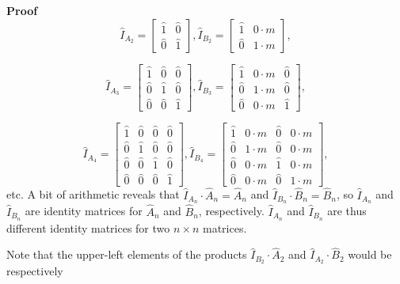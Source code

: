 \documentclass[10pt,letterpaper]{article}
\newenvironment{proof}{\noindent\textbf{Proof} }{\qed \newline}
\newcommand{\qed}{\nobreak \ifvmode \relax \else
      \ifdim\lastskip<1.5em \hskip-\lastskip
      \hskip1.5em plus0em minus0.5em \fi \nobreak
      \vrule height0.75em width0.5em depth0.25em\fi}
\numberwithin{equation}{section}
\begin{document}
\begin{proof}
\[ \hat I_{A_2} = \left[ \begin{matrix} 
  \hat 1 & \hat 0 \\
  \hat 0 & \hat 1
 \end{matrix} \right] ,
\hat I_{B_2} = \left[ \begin{matrix} 
  \hat 1 & 0 \cdot m \\
  \hat 0 & 1 \cdot m
 \end{matrix} \right] , \]
 
 \[ \hat I_{A_3} = \left[ \begin{matrix} 
  \hat 1 & \hat 0 & \hat 0 \\
  \hat 0 & \hat 1 & \hat 0 \\
  \hat 0 & \hat 0 & \hat 1
 \end{matrix} \right] ,
 \hat I_{B_3} = \left[ \begin{matrix} 
  \hat 1 & 0 \cdot m & \hat 0 \\
  \hat 0 & 1 \cdot m & \hat 0 \\
  \hat 0 & 0 \cdot m & \hat 1
 \end{matrix} \right] , \]
 
 \[ \hat I_{A_4} = \left[ \begin{matrix} 
  \hat 1 & \hat 0 & \hat 0 & \hat 0 \\
  \hat 0 & \hat 1 & \hat 0 & \hat 0 \\
  \hat 0 & \hat 0 & \hat 1 & \hat 0 \\
  \hat 0 & \hat 0 & \hat 0 & \hat 1
 \end{matrix} \right] ,
 \hat I_{B_4} = \left[ \begin{matrix} 
  \hat 1 & 0 \cdot m & \hat 0 & 0 \cdot m \\
  \hat 0 & 1 \cdot m & \hat 0 & 0 \cdot m \\
  \hat 0 & 0 \cdot m & \hat 1 & 0 \cdot m \\
  \hat 0 & 0 \cdot m & \hat 0 & 1 \cdot m
 \end{matrix} \right] , \] etc.  A bit of arithmetic reveals that
$\hat I_{A_n} \cdot \hat A_n = \hat A_n$ and $\hat I_{B_n} \cdot \hat
B_n = \hat B_n$, so $\hat I_{A_n}$ and $\hat I_{B_n}$ are identity
matrices for $\hat A_n$ and $\hat B_n$, respectively.  $\hat I_{A_n}$
and $\hat I_{B_n}$ are thus different identity matrices for two $n
\times n$ matrices.\end{proof}

Note that the upper-left elements of the products $\hat I_{B_2} \cdot
\hat A_2$ and $\hat I_{A_2} \cdot \hat B_2$ would be respectively
\end{document}
